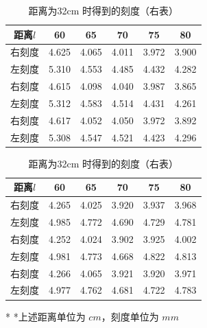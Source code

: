 \documentclass[UTF8]{ctexart}
\begin{document}
\begin{table}[H]
\centering
\caption{改变物镜与目镜之间的距离测量像宽}
\begin{minipage}{0.47\linewidth}
\centering
\caption*{距离为25cm 时得到的刻度（左表）}
\begin{tabular}{c|c|c|c|c|c|}
\toprule[1pt]
\midrule
距离$l$  & 60 & 65 & 70 & 75 & 80 \\
\midrule
右刻度 &  4.625 & 4.065 & 4.011 & 3.972& 3.900\\
左刻度 &  5.310 & 4.553 & 4.485 & 4.432 & 4.282\\
\midrule
右刻度 & 4.615 & 4.098 & 4.040 & 3.987 & 3.865 \\
左刻度 & 5.312 & 4.583 & 4.514 & 4.431 & 4.261 \\
\midrule
右刻度 & 4.617 & 4.052 & 4.050 & 3.972 & 3.892 \\
左刻度 & 5.308 & 4.547 & 4.521 &  4.423 & 4.296 \\
\midrule
\bottomrule[1pt]
\end{tabular}
\end{minipage}%
\hspace{0.05\linewidth} %
\begin{minipage}{0.46\linewidth}
\centering
\caption*{距离为32cm 时得到的刻度（右表）}
\begin{tabular}{c|c|c|c|c|c}
\toprule[1pt]
\midrule
距离$l$ & 60 & 65 & 70 & 75 & 80 \\
\midrule
右刻度 &  4.265 & 4.025 & 3.920 & 3.937 & 3.968\\
左刻度 &  4.985 & 4.772 & 4.690 & 4.729 & 4.781\\
\midrule
右刻度 & 4.252 & 4.024 & 3.902 & 3.925 & 4.002\\
左刻度 & 4.981 & 4.773 & 4.668 & 4.822 & 4.813\\
\midrule
右刻度 & 4.266 & 4.065 & 3.921 & 3.920 & 3.971\\
左刻度 & 4.977 & 4.762 & 4.681 & 4.722 & 4.783\\
\midrule
\bottomrule[1pt]
\end{tabular}
\end{minipage}
\begin{tablenotes}
\centering
    \footnotesize
    \item[*] *上述距离单位为 $cm$，刻度单位为 $mm$
\end{tablenotes}
\end{table}
\end{document}

